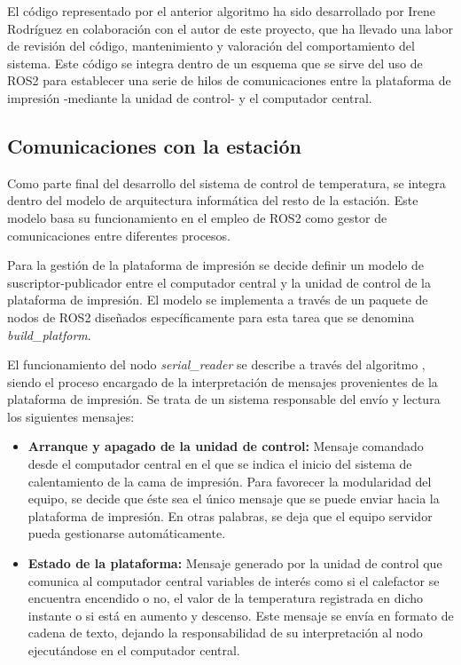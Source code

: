 El código representado por el anterior algoritmo ha sido desarrollado por Irene Rodríguez en colaboración con el autor de este proyecto, que ha llevado una labor de revisión del código, mantenimiento y valoración del comportamiento del sistema. Este código se integra dentro de un esquema que se sirve del uso de ROS2 para establecer una serie de hilos de comunicaciones entre la plataforma de impresión -mediante la unidad de control- y el computador central.

\subsection{Comunicaciones con la estación}

Como parte final del desarrollo del sistema de control de temperatura, se integra dentro del modelo de arquitectura informática del resto de la estación. Este modelo basa su funcionamiento en el empleo de ROS2 como gestor de comunicaciones entre diferentes procesos.

Para la gestión de la plataforma de impresión se decide definir un modelo de suscriptor-publicador entre el computador central y la unidad de control de la plataforma de impresión. El modelo se implementa a través de un paquete de nodos de ROS2 diseñados específicamente para esta tarea que se denomina \textit{build\_platform}.

El funcionamiento del nodo \textit{serial\_reader} se describe a través del algoritmo  , siendo el proceso encargado de la interpretación de mensajes provenientes de la plataforma de impresión. Se trata de un sistema responsable del envío y lectura los siguientes mensajes:
\begin{itemize}
    \item \textbf{Arranque y apagado de la unidad de control:} Mensaje comandado desde el computador central en el que se indica el inicio del sistema de calentamiento de la cama de impresión. Para favorecer la modularidad del equipo, se decide que éste sea el único mensaje que se puede enviar hacia la plataforma de impresión. En otras palabras, se deja que el equipo servidor pueda gestionarse automáticamente.
    \item \textbf{Estado de la plataforma:} Mensaje generado por la unidad de control que comunica al computador central variables de interés como si el calefactor se encuentra encendido o no, el valor de la temperatura registrada en dicho instante o si está en aumento y descenso. Este mensaje se envía en formato de cadena de texto, dejando la responsabilidad de su interpretación al nodo ejecutándose en el computador central.
\end{itemize}

